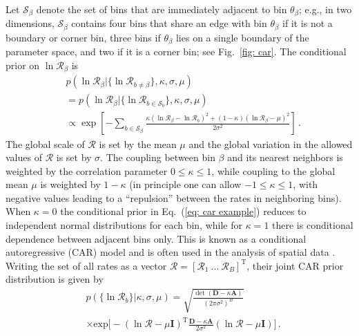 \documentclass[%
reprint,
 amsmath,amssymb,
 aps,
 prd,nofootinbib,nobibnotes,
 superscriptaddress,groupedaddress,
]{revtex4-2}
\begin{document}
Let $\mathcal{S}_\beta$ denote the set of bins that are immediately adjacent to bin $\theta_\beta$; e.g., in two dimensions, $\mathcal{S}_\beta$ contains four bins that share an edge with bin $\theta_\beta$ if it is not a boundary or corner bin, three bins if $\theta_\beta$ lies on a single boundary of the parameter space, and two if it is a corner bin; see Fig.~\ref{fig: car}. The conditional prior on $\ln\mathcal{R}_\beta$ is
\begin{align}
\label{eq: car example}
& p ( \ln\mathcal{R}_\beta | \{ \ln\mathcal{R}_{b\neq\beta} \} , \kappa , \sigma , \mu )
\\
& =
p ( \ln\mathcal{R}_\beta | \{ \ln\mathcal{R}_{b\in\mathcal{S}_b} \} , \kappa , \sigma , \mu )
\nonumber \\
& \propto
\exp[
- \sum_{b \in \mathcal{S}_\beta}
\frac{ \kappa ( \ln\mathcal{R}_\beta - \ln\mathcal{R}_b )^2 + ( 1 - \kappa ) ( \ln\mathcal{R}_\beta - \mu )^2 }{ 2 \sigma^2 }
]
\nonumber
\, .
\end{align}
The global scale of $\mathcal{R}$ is set by the mean $\mu$ and the global variation in the allowed values of $\mathcal{R}$ is set by $\sigma$. The coupling between bin $\beta$ and its nearest neighbors is weighted by the correlation parameter $0\leq\kappa\leq1$, while coupling to the global mean $\mu$ is weighted by $1-\kappa$  (in principle one can allow $-1\leq\kappa\leq1$, with negative values leading to a ``repulsion'' between the rates in neighboring bins). When $\kappa=0$ the conditional prior in Eq.~(\ref{eq: car example}) reduces to independent normal distributions for each bin, while for $\kappa=1$ there is conditional dependence between adjacent bins only. This is known as a conditional autoregressive (CAR) model and is often used in the analysis of spatial data \cite{Cressie2015-ii, Banerjee2011-ym, Rue2023-kt, DeOliveira2010}. Writing the set of all rates as a vector $\boldsymbol{\mathcal{R}} = [\mathcal{R}_1 \ ... \ \mathcal{R}_B]^\mathrm{T}$, their joint CAR prior distribution is given by \cite{Besag:1974abc, Besag:1995car}
\begin{align}
& p ( \{ \ln\mathcal{R}_b \} | \kappa , \sigma , \mu )
=
\sqrt{
\frac{ \det ( \mathbf{D} - \kappa \mathbf{A} ) }{ (2\pi \sigma^2 )^B }
}
\nonumber \\
& \times
\mathrm{exp}
\bigg[
- ( \ln\boldsymbol{\mathcal{R}} - \mu \mathbf{I} )^\mathrm{T}
\frac{ \mathbf{D} - \kappa \mathbf{A} }{ 2 \sigma^2 }
( \ln\boldsymbol{\mathcal{R}} - \mu \mathbf{I} )
\bigg]
\, .
\label{eq: car prior}
\end{align}
\end{document}
